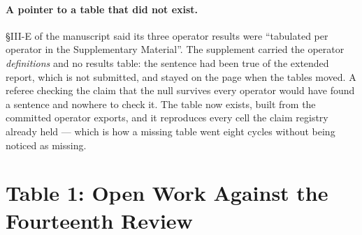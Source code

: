 \documentclass[11pt]{article}
\begin{document}
\paragraph{A pointer to a table that did not exist.} \S III-E of the
manuscript said its three operator results were ``tabulated per operator in
the Supplementary Material''. The supplement carried the operator
\emph{definitions} and no results table: the sentence had been true of the
extended report, which is not submitted, and stayed on the page when the
tables moved. A referee checking the claim that the null survives every
operator would have found a sentence and nowhere to check it. The table now
exists, built from the committed operator exports, and it
reproduces every cell the claim registry already held --- which is how a
missing table went eight cycles without being noticed as missing.

\section*{Table 1: Open Work Against the Fourteenth Review}
\end{document}
